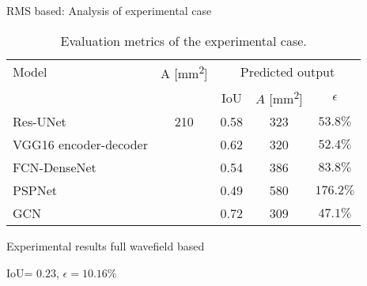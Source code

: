 \documentclass[10pt,aspectratio=169,dvipsnames]{beamer} %
\begin{document}
\begin{frame}{RMS based: Analysis of experimental case}
	\begin{table}[!ht]
		\centering
		\caption{Evaluation metrics of the experimental case.}
		\label{tab:rms_exp_case}
		\begin{tabular}{l@{\ }cccc}
			\toprule
			\multicolumn{1}{l}{Model} & \multicolumn{1}{c}{A [mm\textsuperscript{2}]} & \multicolumn{3}{c}{Predicted output} \\ 
			\cmidrule(lr){3-5} & & \multicolumn{1}{c}{IoU} & \multicolumn{1}{c}{\(\hat{A}\) [mm\textsuperscript{2}]} & \(\epsilon\) \\ \midrule
			Res-UNet & \multicolumn{1}{c}{210} & \multicolumn{1}{c}{0.58} & \multicolumn{1}{c}{323}  & \(53.8\%\) \\ 
			VGG16 encoder-decoder &  & \multicolumn{1}{c}{0.62} & \multicolumn{1}{c}{320} & \(52.4\%\) 
			\\ 
			FCN-DenseNet &  & \multicolumn{1}{c}{0.54} & \multicolumn{1}{c}{386} & \(83.8\%\) \\ 
			PSPNet &  & \multicolumn{1}{c}{0.49} & \multicolumn{1}{c}{580} & \(176.2\%\) 
			\\ 
			GCN &  & \multicolumn{1}{c}{0.72} & \multicolumn{1}{c}{309} & \(47.1\%\) 
			\\ 
			\bottomrule
		\end{tabular}		
	\end{table}
\end{frame}

\setcounter{subfigure}{0}
\begin{frame}{Experimental results full wavefield based}
		\centering
		\begin{figure}
			\qquad
		\end{figure}			
	IoU= $0.23$, $\epsilon=10.16\%$
\end{frame}
\end{document}
